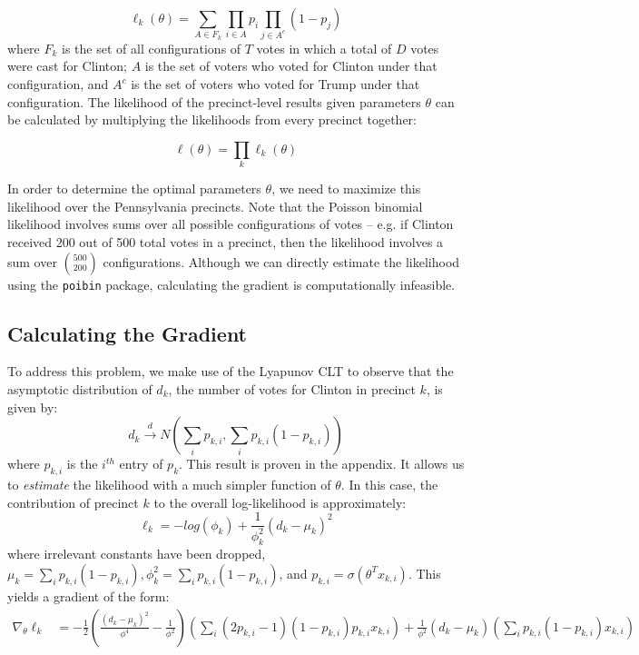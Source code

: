 \documentclass[10pt, letterpaper]{article}
\begin{document}
$$\ell_k(\theta) = \sum_{A \in F_k} \prod_{i \in A} p_i \prod_{j \in A^c}(1 - p_j)$$
where $F_k$ is the set of all configurations of $T$ votes in which a total of $D$ votes were cast for Clinton; $A$ is the set of voters who voted for Clinton under that configuration, and $A^c$ is the set of voters who voted for Trump under that configuration. The likelihood of the precinct-level results given parameters $\theta$ can be calculated by multiplying the likelihoods from every precinct together:

$$\ell(\theta) = \prod_k \ell_k(\theta)$$

In order to determine the optimal parameters $\theta$, we need to maximize this likelihood over the Pennsylvania precincts. Note that the Poisson binomial likelihood involves sums over all possible configurations of votes -- e.g. if Clinton received 200 out of 500 total votes in a precinct, then the likelihood involves a sum over $500 \choose 200$ configurations. Although we can directly estimate the likelihood using the \texttt{poibin} package, calculating the gradient is computationally infeasible.

\subsection{Calculating the Gradient}

To address this problem, we make use of the Lyapunov CLT\cite{LyapunovCondition} to observe that the asymptotic distribution of $d_k$, the number of votes for Clinton in precinct $k$, is given by: 
\[ d_k \stackrel{d} \longrightarrow N \left(\sum_{i} p_{k,i}, \sum_{i} p_{k, i}(1-p_{k, i}) \right) \] 
where $p_{k, i}$ is the $i^{th}$ entry of $p_k$. This result is proven in the appendix. It allows us to \emph{estimate} the likelihood with a much simpler function of $\theta$. In this case, the contribution of precinct $k$ to the overall log-likelihood is approximately: 
\[ \ell_k = -log \left( \phi_k\right) + \frac{1}{\phi_k^2} \left( d_k -\mu_k \right)^2  \] 
where irrelevant constants have been dropped, $\mu_k =  \sum_{i} p_{k, i}(1-p_{k, i}), \phi_k^2 = \sum_{i} p_{k, i}(1-p_{k, i})$, and $p_{k, i} = \sigma(\theta^T x_{k, i})$. This yields a gradient of the form: 
\begin{align*}
\nabla_{\theta} \ell_k &=  -\frac{1}{2} \left(\frac{(d_k - \mu_k)^2}{\phi^4} - \frac{1}{\phi^2} \right) \left( \sum_{i} (2 p_{k, i} - 1)(1-p_{k, i})p_{k, i}x_{k, i} \right) + \frac{1}{\phi^2} (d_k - \mu_k) \left( \sum_i p_{k, i} (1 - p_{k, i}) x_{k, i} \right)
\end{align*}
\end{document}
